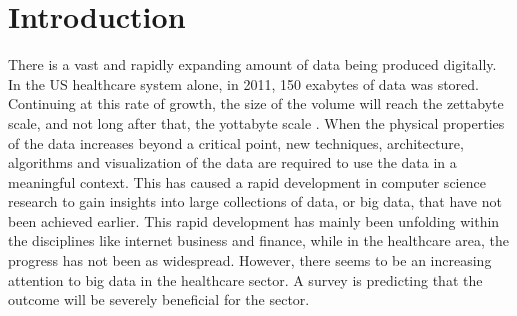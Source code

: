 \section{Introduction}
There is a vast and rapidly expanding amount of data being produced digitally. In the US healthcare system alone, in 2011, 150 exabytes of data was stored. Continuing at this rate of growth, the size of the volume will reach the zettabyte scale, and not long after that, the yottabyte scale \cite{intro}. 
When the physical properties of the data increases beyond a critical point, new techniques, architecture, algorithms and visualization of the data are required to use the data in a meaningful context. This has caused a rapid development in computer science research to gain insights into large collections of data, or big data, that have not been achieved earlier. This rapid development has mainly been unfolding within the disciplines like internet business and finance, while in the healthcare area, the progress has not been as widespread. However, there seems to be an increasing attention to big data in the healthcare sector. A survey is predicting that the outcome will be severely beneficial for the sector.\cite{gg}

